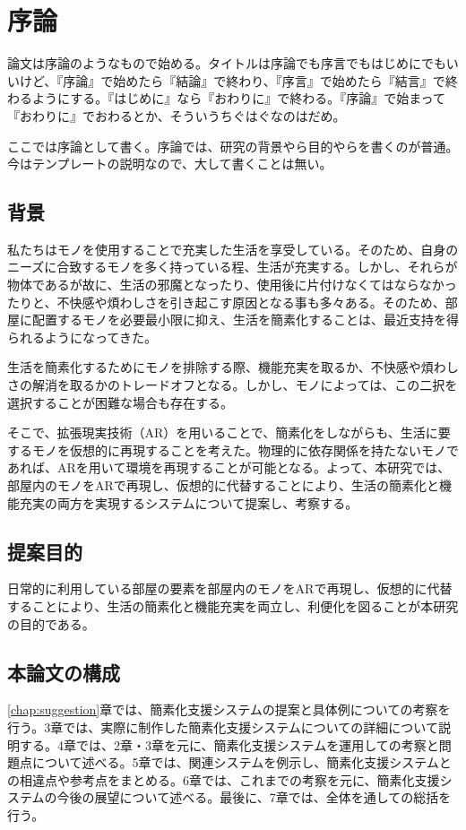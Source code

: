 \chapter{序論}
\label{chap:introduction}

論文は序論のようなもので始める。タイトルは序論でも序言でもはじめにでもいいけど、『序論』で始めたら『結論』で終わり、『序言』で始めたら『結言』で終わるようにする。『はじめに』なら『おわりに』で終わる。『序論』で始まって『おわりに』でおわるとか、そういうちぐはぐなのはだめ。

ここでは序論として書く。序論では、研究の背景やら目的やらを書くのが普通。今はテンプレートの説明なので、大して書くことは無い。

\newpage

\section{背景}

私たちはモノを使用することで充実した生活を享受している。そのため、自身のニーズに合致するモノを多く持っている程、生活が充実する。しかし、それらが物体であるが故に、生活の邪魔となったり、使用後に片付けなくてはならなかったりと、不快感や煩わしさを引き起こす原因となる事も多々ある。そのため、部屋に配置するモノを必要最小限に抑え、生活を簡素化することは、最近支持を得られるようになってきた。

生活を簡素化するためにモノを排除する際、機能充実を取るか、不快感や煩わしさの解消を取るかのトレードオフとなる。しかし、モノによっては、この二択を選択することが困難な場合も存在する。

そこで、拡張現実技術（AR）を用いることで、簡素化をしながらも、生活に要するモノを仮想的に再現することを考えた。物理的に依存関係を持たないモノであれば、ARを用いて環境を再現することが可能となる。よって、本研究では、部屋内のモノをARで再現し、仮想的に代替することにより、生活の簡素化と機能充実の両方を実現するシステムについて提案し、考察する。

\section{提案目的}

日常的に利用している部屋の要素を部屋内のモノをARで再現し、仮想的に代替することにより、生活の簡素化と機能充実を両立し、利便化を図ることが本研究の目的である。

\section{本論文の構成}

\ref{chap:suggestion}章では、簡素化支援システムの提案と具体例についての考察を行う。3章では、実際に制作した簡素化支援システムについての詳細について説明する。4章では、2章・3章を元に、簡素化支援システムを運用しての考察と問題点について述べる。5章では、関連システムを例示し、簡素化支援システムとの相違点や参考点をまとめる。6章では、これまでの考察を元に、簡素化支援システムの今後の展望について述べる。最後に、7章では、全体を通しての総括を行う。
